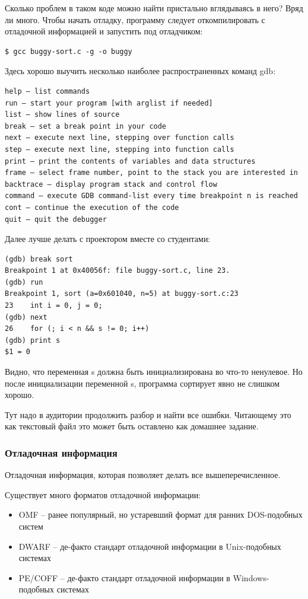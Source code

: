 \documentclass[a4paper,12pt,oneside]{article}
\begin{document}
Сколько проблем в таком коде можно найти пристально вглядываясь в него? Вряд ли много. Чтобы начать отладку, программу следует откомпилировать с отладочной информацией и запустить под отладчиком:

\begin{verbatim}
$ gcc buggy-sort.c -g -o buggy
\end{verbatim}

Здесь хорошо выучить несколько наиболее распространенных команд gdb:

\begin{verbatim}
help – list commands 
run – start your program [with arglist if needed] 
list – show lines of source 
break – set a break point in your code 
next – execute next line, stepping over function calls 
step – execute next line, stepping into function calls 
print – print the contents of variables and data structures 
frame – select frame number, point to the stack you are interested in 
backtrace – display program stack and control flow 
command – execute GDB command-list every time breakpoint n is reached 
cont – continue the execution of the code 
quit – quit the debugger
\end{verbatim}

Далее лучше делать с проектором вместе со студентами:

\begin{verbatim}
(gdb) break sort
Breakpoint 1 at 0x40056f: file buggy-sort.c, line 23.
(gdb) run
Breakpoint 1, sort (a=0x601040, n=5) at buggy-sort.c:23
23	  int i = 0, j = 0;
(gdb) next
26	  for (; i < n && s != 0; i++) 
(gdb) print s
$1 = 0
\end{verbatim}

Видно, что переменная s должна быть инициализирована во что-то ненулевое. Но после инициализации переменной s, программа сортирует явно не слишком хорошо.

Тут надо в аудитории продолжить разбор и найти все ошибки. Читающему это как текстовый файл это может быть оставлено как домашнее задание.

\subsubsection{Отладочная информация}\label{subsubsec:DWARF}

Отладочная информация, которая позволяет делать все вышеперечисленное. 

Существует много форматов отладочной информации:

\begin{itemize}
\item OMF -- ранее популярный, но устаревший формат для ранних DOS-подобных систем
\item DWARF -- де-факто стандарт отладочной информации в Unix-подобных системах
\item PE/COFF -- де-факто стандарт отладочной информации в Windows-подобных системах
\end{itemize}
\end{document}
